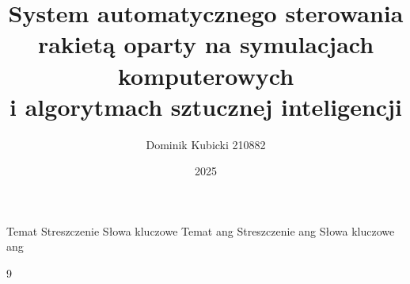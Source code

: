 \documentclass{SGGW-thesis/SGGW-thesis}
\title{System automatycznego sterowania rakietą oparty na symulacjach komputerowych\\i algorytmach sztucznej inteligencji}
\author{Dominik Kubicki 210882}
\date{2025}
\begin{document}
\maketitle
\statementpage


\abstractpage
{Temat}
{Streszczenie}
{Słowa kluczowe}
{Temat ang}
{Streszczenie ang}
{Słowa kluczowe ang}

{
  \doublespacing
  \tableofcontents
}
\startchapterfromoddpage










\begin{thebibliography}{9}
  
\end{thebibliography}

\beforelastpage
\end{document}
